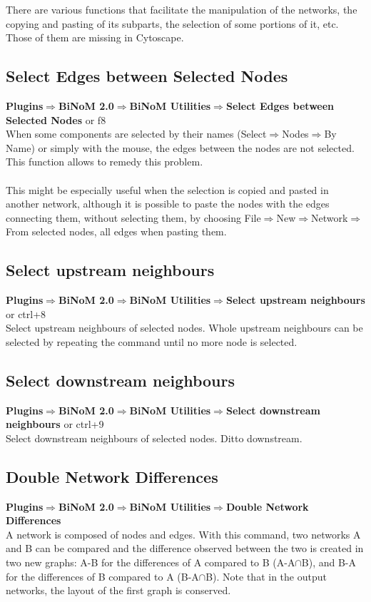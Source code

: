 There are various functions that facilitate the manipulation of the networks, the copying and pasting of its subparts, the selection of some portions of it, etc. Those of them are missing in Cytoscape.
\subsection{Select Edges between Selected Nodes}
\textbf{Plugins$\Rightarrow$BiNoM 2.0$\Rightarrow$BiNoM Utilities$\Rightarrow$Select Edges between Selected Nodes} or f8\\
When some components are selected by their names (Select$\Rightarrow$Nodes$\Rightarrow$By Name) or simply with the mouse, the edges between the nodes are not selected. This function allows to remedy this problem.\\\\
This might be especially useful when the selection is copied and pasted in another network, although it is possible to paste the nodes with the edges connecting them, without selecting them, by choosing File$\Rightarrow$New$\Rightarrow$Network$\Rightarrow$From selected nodes, all edges when pasting them.

\subsection{Select upstream neighbours}
\textbf{Plugins$\Rightarrow$BiNoM 2.0$\Rightarrow$BiNoM Utilities$\Rightarrow$Select upstream neighbours} or ctrl+8\\
Select upstream neighbours of selected nodes. Whole upstream neighbours can be selected by repeating the command until no more node is selected.

\subsection{Select downstream neighbours}
\textbf{Plugins$\Rightarrow$BiNoM 2.0$\Rightarrow$BiNoM Utilities$\Rightarrow$Select downstream neighbours} or ctrl+9\\
Select downstream neighbours of selected nodes. Ditto downstream.

\subsection{Double Network Differences}
\textbf{Plugins$\Rightarrow$BiNoM 2.0$\Rightarrow$BiNoM Utilities$\Rightarrow$Double Network Differences}\\
A network is composed of nodes and edges. With this command, two networks A and B can be compared and the difference observed between the two is created in two new graphs: A-B for the differences of A compared to B (A-A$\cap$B), and B-A for the differences of B compared to A (B-A$\cap$B). Note that in the output networks, the layout of the first graph is conserved.

